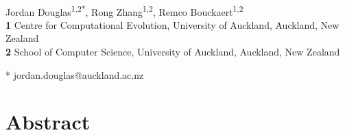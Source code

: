 \documentclass[10pt,letterpaper]{article}
\begin{document}
\vspace*{0.2in}

\begin{flushleft}
{\Large
\textbf{} %
}
\newline
\\
Jordan Douglas\textsuperscript{1,2*},
Rong Zhang\textsuperscript{1,2},
Remco Bouckaert\textsuperscript{1,2}
\\
\bigskip
\textbf{1} Centre for Computational Evolution,  University of Auckland, Auckland, New Zealand\\
\textbf{2} School of Computer Science, University of Auckland, Auckland, New Zealand\\
\bigskip


* jordan.douglas@auckland.ac.nz


\end{flushleft}
\section*{Abstract}


\end{document}
